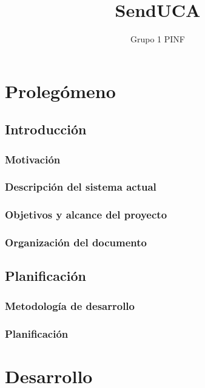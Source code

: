 \documentclass[12pt,letterpaper]{report}
\title{SendUCA}
\author{Grupo 1 PINF}
\begin{document}
	\maketitle
	\thispagestyle{empty}
	\newpage
	\tableofcontents
	
	
	
	\lstset{language=bash, numbers=left, numberstyle=\tiny, numbersep=10pt, firstnumber=1, stepnumber=1}
	
\chapter{Prolegómeno}		
\section{Introducción}
	\subsection{Motivación}
	\subsection{Descripción del sistema actual}
	\subsection{Objetivos y alcance del proyecto}
	\subsection{Organización del documento}

\section{Planificación}
	\subsection{Metodología de desarrollo}
	\subsection{Planificación}

\chapter{Desarrollo}
\end{document}
